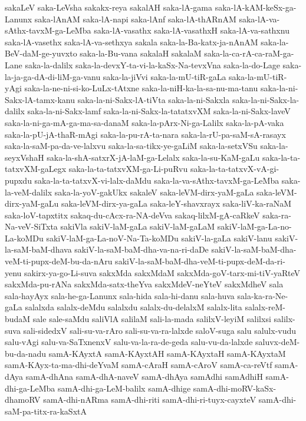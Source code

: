 {sakaLeV
saka-LeVsha
sakakx-reya
sakalAH
saka-lA-gama
saka-lA-kAM-keSx-ga-Lanunx
saka-lAnAM
saka-lA-napi
saka-lAnf
saka-lA-thARnAM
saka-lA-va-sAthx-tavxM-ga-LeMba
saka-lA-vasathx
saka-lA-vasathxH
saka-lA-va-sathxnu
saka-lA-vasethx
saka-lA-va-sethxya
sakala
saka-la-Ba-katx-ja-nAnAM
saka-la-BeV-daM-ge-yuvxto
saka-la-Bu-vana
sakalaH
sakalaM
saka-la-ca-rA-ca-raM-ga-Lane
saka-la-dalilx
saka-la-devxY-ta-vi-la-kaSx-Na-tevxVna
saka-la-do-Lage
saka-la-ja-ga-dA-di-liM-ga-vanu
saka-la-jiVvi
saka-la-mU-tiR-gaLa
saka-la-mU-tiR-yAgi
saka-la-ne-ni-si-ko-LuLx-tAtxne
saka-la-niH-ka-la-sa-nu-ma-tanu
saka-la-ni-Sakx-lA-tamx-kanu
saka-la-ni-Sakx-lA-tiVta
saka-la-ni-Sakxla
saka-la-ni-Sakx-la-dalilx
saka-la-ni-Sakx-lamf
saka-la-ni-Sakx-la-tatatxvXM
saka-la-ni-Sakx-laveV
saka-la-ni-ga-mA-ga-ma-sa-danaM
saka-la-pArx-Ni-ga-Lalilx
saka-la-pA-vaka
saka-la-pU-jA-thaR-mAgi
saka-la-pu-rA-ta-nara
saka-la-rU-pa-saM-sA-rasayx
saka-la-saM-pa-da-ve-lalxvu
saka-la-sa-tikx-ye-gaLiM
saka-la-setxVSu
saka-la-seyxVshaH
saka-la-shA-satxrX-jA-laM-ga-Lelalx
saka-la-su-KaM-gaLu
saka-la-ta-tatxvXM-gaLegx
saka-la-ta-tatxvXM-ga-Li-puRvu
saka-la-ta-tatxvX-vA-gi-pupxdu
saka-la-ta-tatxvX-vi-lalx-daMdu
saka-la-va-sAthx-tavxM-ga-LeMba
saka-la-veM-dalilx
saka-la-yoV-gakUkx
sakaleV
saka-leVM-dirx-yaM-gaLa
saka-leVM-dirx-yaM-gaLu
saka-leVM-dirx-ya-gaLa
saka-leY-shavxrayx
saka-liV-ka-raNaM
saka-loV-tapxtitx
sakaq-du-cAcx-ra-NA-deVva
sakaq-lilxM-gA-caRkeV
saka-ra-Na-veV-SiTxta
sakiVla
sakiV-laM-gaLa
sakiV-laM-gaLaM
sakiV-laM-ga-La-no-La-koMDu
sakiV-laM-ga-La-noV-Na-Ta-koMDu
sakiV-la-gaLa
sakiV-lanu
sakiV-la-saM-baM-dhava
sakiV-la-saM-baM-dha-va-na-ri-daDe
sakiV-la-saM-baM-dha-veM-ti-pupx-deM-bu-da-nAru
sakiV-la-saM-baM-dha-veM-ti-pupx-deM-da-ri-yenu
sakirx-ya-go-Li-suva
sakxMda
sakxMdaM
sakxMda-goV-tarx-mi-tiV-yaRteV
sakxMda-pu-rANa
sakxMda-satx-theYva
sakxMdeV-neYteV
sakxMdheV
sala
sala-hayAyx
sala-he-ga-Lanunx
sala-hida
sala-hi-danu
sala-huva
sala-ka-ra-Ne-gaLa
salalxda
salalx-deMdu
salalxdu
salalx-du-delalxM
salalx-lita
salalx-reM-budaM
sale
sale-saMdu
saliVlA
salilaM
sali-la-mada
salilxV-leyiM
salilxsi
salilx-suva
sali-sidedxV
sali-su-va-rAro
sali-su-va-ra-lalxde
saloV-suga
salu
salulx-vudu
salu-vAgi
salu-va-SaTxnenxV
salu-va-la-ra-de-geda
salu-vu-da-lalxde
saluvx-deM-bu-da-nadu
samA-KAyxtA
samA-KAyxtAH
samA-KAyxtaH
samA-KAyxtaM
samA-KAyx-ta-ma-dhi-deYvaM
samA-cAraH
samA-cAroV
samA-ca-reVtf
samA-dAya
samA-dhAna
samA-dhA-naveV
samA-dhAya
samAdhi
samAdhiH
samA-dhi-ga-LeMba
samA-dhi-ga-LeM-balilx
samA-dhige
samA-dhi-moRV-kaSx-dhamoRV
samA-dhi-nARma
samA-dhi-riti
samA-dhi-ri-tuyx-cayxteV
samA-dhi-saM-pa-titx-ra-kaSxtA
}
